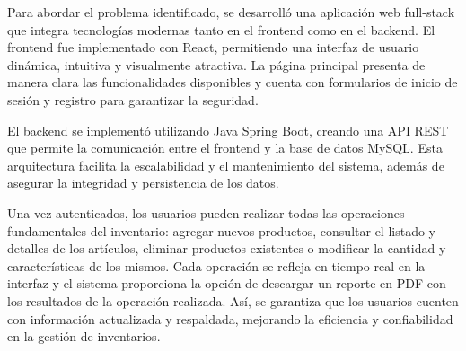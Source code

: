 Para abordar el problema identificado, se desarrolló una aplicación web full-stack que integra tecnologías modernas tanto en el frontend como en el backend. El frontend fue implementado con React, permitiendo una interfaz de usuario dinámica, intuitiva y visualmente atractiva. La página principal presenta de manera clara las funcionalidades disponibles y cuenta con formularios de inicio de sesión y registro para garantizar la seguridad.

El backend se implementó utilizando Java Spring Boot, creando una API REST que permite la comunicación entre el frontend y la base de datos MySQL. Esta arquitectura facilita la escalabilidad y el mantenimiento del sistema, además de asegurar la integridad y persistencia de los datos.

Una vez autenticados, los usuarios pueden realizar todas las operaciones fundamentales del inventario: agregar nuevos productos, consultar el listado y detalles de los artículos, eliminar productos existentes o modificar la cantidad y características de los mismos. Cada operación se refleja en tiempo real en la interfaz y el sistema proporciona la opción de descargar un reporte en PDF con los resultados de la operación realizada. Así, se garantiza que los usuarios cuenten con información actualizada y respaldada, mejorando la eficiencia y confiabilidad en la gestión de inventarios.
